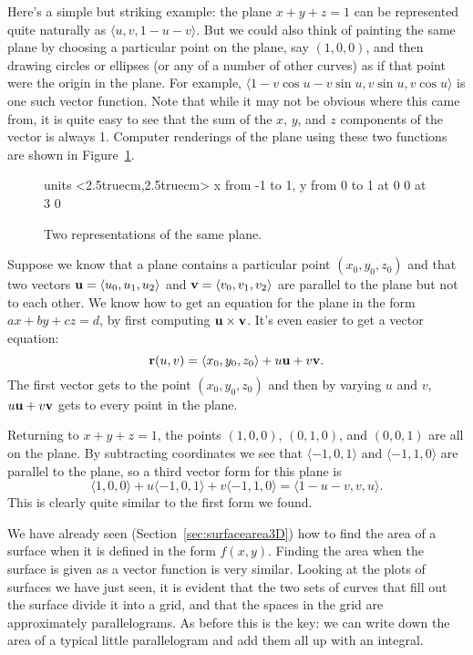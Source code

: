 Here's a simple but striking example: the plane $x+y+z=1$ can be
represented quite naturally as $\langle u,v,1-u-v\rangle$. But we
could also think of painting the same plane by choosing a particular
point on the plane, say $(1,0,0)$, and then drawing circles or
ellipses (or any of a number of other curves) as if that point were
the origin in the plane. For example, $\langle 1-v\cos u-v\sin u,v\sin
u,v\cos u\rangle$ is one such vector function. Note that while it may
not be obvious where this came from, it is quite easy to see that
the sum of the $x$, $y$, and $z$ components of the vector is always
1. Computer renderings of the plane using these two functions are shown
in Figure~\ref{fig:two plane parameterizations}.

\begin{figure}[H]
\centerline{
\vbox{\beginpicture
\normalgraphs
\setcoordinatesystem units <2.5truecm,2.5truecm>
\setplotarea x from -1 to 1, y from 0 to 1
 at 0 0
 at 3 0
\endpicture}}
\caption{Two representations of the same plane. \label{fig:two plane parameterizations}}
\end{figure}

Suppose we know that a plane contains a particular point
$(x_0,y_0,z_0)$ and that two vectors ${\bf u}=\langle
u_0,u_1,u_2\rangle$ and ${\bf v}=\langle
v_0,v_1,v_2\rangle$ are parallel to the plane but not to each
other. We know how to get an equation for the plane in the form
$ax+by+cz=d$, by first computing ${\bf u}\times{\bf v}$. It's even
easier to get a vector equation:
$${\bf r}(u,v) = \langle x_0,y_0,z_0\rangle + u{\bf u} + v{\bf v}.$$
The first vector gets to the point $(x_0,y_0,z_0)$ and then by varying
$u$ and $v$, $u{\bf u} + v{\bf v}$ gets to every point in the plane.

Returning to $x+y+z=1$, the points $(1,0,0)$, $(0,1,0)$, and $(0,0,1)$
are all on the plane. By subtracting coordinates we see that
$\langle -1,0,1\rangle$ and $\langle -1,1,0\rangle$ are parallel to
the plane, so a third vector form for this plane is
$$\langle 1,0,0\rangle + u\langle -1,0,1\rangle + v\langle
-1,1,0\rangle
= \langle 1-u-v,v,u\rangle.$$
This is clearly quite similar to the first form we found.

We have already seen (Section~\ref{sec:surfacearea3D})
how to find the area of a surface when it is
defined in the form $f(x,y)$. Finding the area when the surface is
given as a vector function is very similar. Looking at the plots of
surfaces we have just seen, it is evident that the two sets of curves
that fill out the surface divide it into a grid, and that the spaces
in the grid are approximately parallelograms. As before this is the
key: we can write down the area of a typical little parallelogram and
add them all up with an integral.

